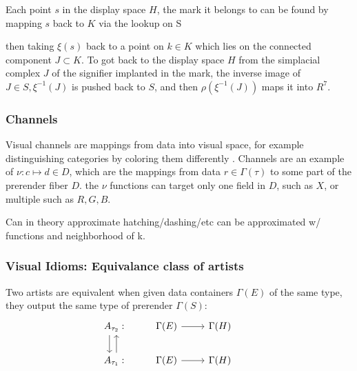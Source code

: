 \documentclass[../main.tex]{subfiles}
\begin{document}
Each point $s$ in the display space $H$, the mark it belongs to can be found by mapping $s$ back to $K$ via the lookup on S 

then taking $\xi(s)$ back to a point on $k \in K$ which lies on the connected component $J \subset K$. To got back to the display space $H$  from the simplacial complex $J$ of the signifier implanted in the mark, the inverse image of $J \in S, \xi^{-1}(J)$ is pushed back to $S$, and then  $\rho(\xi^{-1}(J))$ maps it into $R^{7}$. 


\subsubsection{Channels}
Visual channels are mappings from data into visual space, for example distinguishing categories by coloring them differently  \cite{bertinIIPropertiesGraphic2011,munznerMarksChannels}. Channels are an example of $\nu: c \mapsto d \in D$, which are the mappings from data $r \in \Gamma(\tau)$ to some part of the prerender fiber $D$. the $\nu$ functions can target only one field in $D$, such as $X$, or multiple such as $R,G,B$. 











 Can in theory approximate hatching/dashing/etc can be approximated w/ functions and neighborhood of k. 


\subsubsection{Visual Idioms: Equivalance class of artists}
Two artists are equivalent when given data containers $\Gamma(E)$ of the same type, they output the same type of prerender $\Gamma(S)$:
\begin{equation}
    \begin{tikzcd}
        A_{\tau_2}: \arrow[d, shift right=2] & \Gamma(E) \arrow[r] & \Gamma(H) &                                                \\
        A_{\tau_1}: \arrow[u, shift right]   & \Gamma(E) \arrow[r] & \Gamma(H) 
    \end{tikzcd}
\end{equation}
\end{document}
